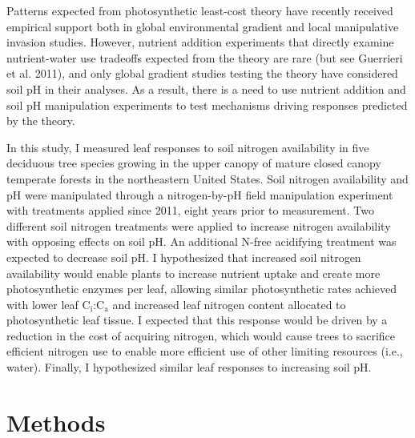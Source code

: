 Patterns expected from photosynthetic least-cost theory have recently received empirical support both in global environmental gradient  and local manipulative invasion  studies. However, nutrient addition experiments that directly examine nutrient-water use tradeoffs expected from the theory are rare (but see Guerrieri et al. 2011), and only global gradient studies testing the theory have considered soil pH in their analyses. As a result, there is a need to use nutrient addition and soil pH manipulation experiments to test mechanisms driving responses predicted by the theory.

In this study, I measured leaf responses to soil nitrogen availability in five deciduous tree species growing in the upper canopy of mature closed canopy temperate forests in the northeastern United States. Soil nitrogen availability and pH were manipulated through a nitrogen-by-pH field manipulation experiment with treatments applied since 2011, eight years prior to measurement. Two different soil nitrogen treatments were applied to increase nitrogen availability with opposing effects on soil pH. An additional N-free acidifying treatment was expected to decrease soil pH. I hypothesized that increased soil nitrogen availability would enable plants to increase nutrient uptake and create more photosynthetic enzymes per leaf, allowing similar photosynthetic rates achieved with lower leaf C$_\mathrm{i}$:C$_\mathrm{a}$ and increased leaf nitrogen content allocated to photosynthetic leaf tissue. I expected that this response would be driven by a reduction in the cost of acquiring nitrogen, which would cause trees to sacrifice efficient nitrogen use to enable more efficient use of other limiting resources (i.e., water). Finally, I hypothesized similar leaf responses to increasing soil pH.

\section{Methods}
